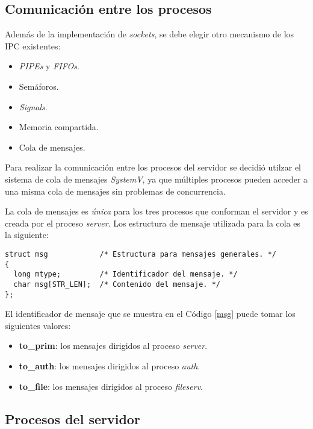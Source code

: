 \documentclass[12pt,a4paper]{article}
\begin{document}
\subsection{Comunicación entre los procesos}
\label{ipc}
Además de la implementación de \emph{sockets}, se debe elegir
otro mecanismo de los IPC existentes:

\begin{itemize}[leftmargin=1.5cm]
  \item \emph{PIPEs} y \emph{FIFOs}.
  \item Semáforos.
  \item \emph{Signals}.
  \item Memoria compartida.
  \item Cola de mensajes.
\end{itemize}

Para realizar la comunicación entre los procesos del servidor se
decidió utilzar el sistema de cola de mensajes \emph{SystemV}, ya
que múltiples procesos pueden acceder a una misma cola de mensajes
sin problemas de concurrencia.

La cola de mensajes es \emph{única} para los tres procesos que
conforman el servidor y es creada por el proceso \emph{server}.
Los estructura de mensaje utilizada para la cola es la siguiente:

\begin{lstlisting}[caption={Estructura de mensaje.}, label={msg}, language=Ce]
struct msg            /* Estructura para mensajes generales. */
{
  long mtype;         /* Identificador del mensaje. */
  char msg[STR_LEN];  /* Contenido del mensaje. */
};
\end{lstlisting}

El identificador de mensaje que se muestra en el Código \ref{msg}
puede tomar los siguientes valores:

\begin{itemize}[leftmargin=1.5cm]
  \item \textbf{to\_prim}: los mensajes dirigidos al proceso
  \emph{server}.
  \item \textbf{to\_auth}: los mensajes dirigidos al proceso
  \emph{auth}.
  \item \textbf{to\_file}: los mensajes dirigidos al proceso
  \emph{fileserv}.
\end{itemize}

\newpage

\subsection{Procesos del servidor}
\label{server}
\end{document}
